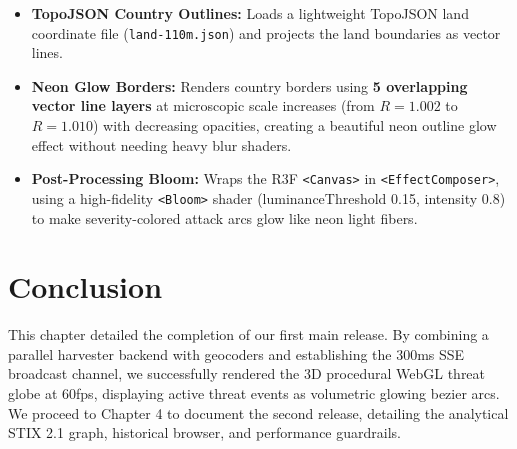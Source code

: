 \begin{itemize}
    \item \textbf{TopoJSON Country Outlines:} Loads a lightweight TopoJSON land coordinate file (\texttt{land-110m.json}) and projects the land boundaries as vector lines.
    \item \textbf{Neon Glow Borders:} Renders country borders using \textbf{5 overlapping vector line layers} at microscopic scale increases (from $R=1.002$ to $R=1.010$) with decreasing opacities, creating a beautiful neon outline glow effect without needing heavy blur shaders.
    \item \textbf{Post-Processing Bloom:} Wraps the R3F \texttt{<Canvas>} in \texttt{<EffectComposer>}, using a high-fidelity \texttt{<Bloom>} shader (luminanceThreshold 0.15, intensity 0.8) to make severity-colored attack arcs glow like neon light fibers.
\end{itemize}

\section{Conclusion}
This chapter detailed the completion of our first main release. By combining a parallel harvester backend with geocoders and establishing the 300ms SSE broadcast channel, we successfully rendered the 3D procedural WebGL threat globe at 60fps, displaying active threat events as volumetric glowing bezier arcs. We proceed to Chapter 4 to document the second release, detailing the analytical STIX 2.1 graph, historical browser, and performance guardrails.
